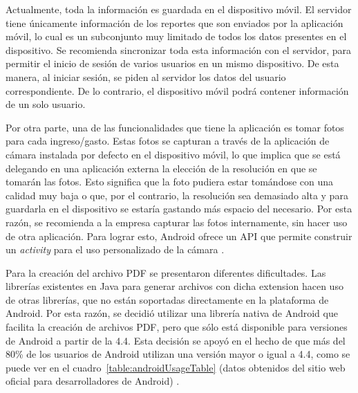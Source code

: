 Actualmente, toda la información es guardada en el dispositivo móvil. El servidor tiene únicamente información de los reportes que son enviados por la aplicación móvil, lo cual es un subconjunto  muy limitado de todos los datos presentes en el dispositivo. Se recomienda sincronizar toda esta información con el servidor, para permitir el inicio de sesión de varios usuarios en un mismo dispositivo. De esta manera, al iniciar sesión, se piden al servidor los datos del usuario correspondiente. De lo contrario, el dispositivo móvil podrá contener información de un solo usuario. 

Por otra parte, una de las funcionalidades que tiene la aplicación es tomar fotos para cada ingreso/gasto. Estas fotos se capturan a través de la aplicación de cámara instalada por defecto en el dispositivo móvil, lo que implica que se está delegando en una aplicación externa la elección de la resolución en que se tomarán las fotos. Esto significa que la foto pudiera estar tomándose con una calidad muy baja o que, por el contrario, la resolución sea demasiado alta y para guardarla en el dispositivo se estaría gastando más espacio del necesario. Por esta razón, se recomienda a la empresa capturar las fotos internamente, sin hacer uso de otra aplicación. Para lograr esto, Android ofrece un API que permite construir un \textit{activity} para el uso personalizado de la cámara \cite{AND4}.

Para la creación del archivo PDF se presentaron diferentes dificultades. Las librerías existentes en Java para generar archivos con dicha extension hacen uso de otras librerías, que no están soportadas directamente en la plataforma de Android. Por esta razón, se decidió utilizar una librería nativa de Android que facilita la creación de archivos PDF, pero que sólo está disponible para versiones de Android a partir de la 4.4. Esta decisión se apoyó en el hecho de que más del 80\% de los usuarios de Android utilizan una versión mayor o igual a 4.4, como se puede ver en el cuadro~\ref{table:androidUsageTable} (datos obtenidos del sitio web oficial para desarrolladores de Android) \cite{USG1}. 


